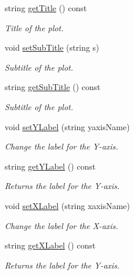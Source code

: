 \begin{DoxyCompactItemize}
string \hyperlink{classbridges_1_1datastructure_1_1_line_chart_aa38d6cf9657d2757a98b657f079ae2bc}{get\+Title} () const
\begin{DoxyCompactList}\small\item\em Title of the plot. \end{DoxyCompactList}\item 
void \hyperlink{classbridges_1_1datastructure_1_1_line_chart_a578c2590cb6baa8ef40ba1251bd1279e}{set\+Sub\+Title} (string s)
\begin{DoxyCompactList}\small\item\em Subtitle of the plot. \end{DoxyCompactList}\item 
string \hyperlink{classbridges_1_1datastructure_1_1_line_chart_a07a4424d4bbc1cdd15cef3e2c0f0c075}{get\+Sub\+Title} () const
\begin{DoxyCompactList}\small\item\em Subtitle of the plot. \end{DoxyCompactList}\item 
void \hyperlink{classbridges_1_1datastructure_1_1_line_chart_ac41be5abf80052f1ace777072845a9d0}{set\+Y\+Label} (string yaxis\+Name)
\begin{DoxyCompactList}\small\item\em Change the label for the Y-\/axis. \end{DoxyCompactList}\item 
string \hyperlink{classbridges_1_1datastructure_1_1_line_chart_a682095169d9a7ce3899f129a13fd9616}{get\+Y\+Label} () const
\begin{DoxyCompactList}\small\item\em Returns the label for the Y-\/axis. \end{DoxyCompactList}\item 
void \hyperlink{classbridges_1_1datastructure_1_1_line_chart_ab31677353448c66017eb93bf61c087ce}{set\+X\+Label} (string xaxis\+Name)
\begin{DoxyCompactList}\small\item\em Change the label for the X-\/axis. \end{DoxyCompactList}\item 
string \hyperlink{classbridges_1_1datastructure_1_1_line_chart_aba75962040195f35f8801714e050ad91}{get\+X\+Label} () const
\begin{DoxyCompactList}\small\item\em Returns the label for the Y-\/axis. \end{DoxyCompactList}\item 

\end{DoxyCompactItemize}
